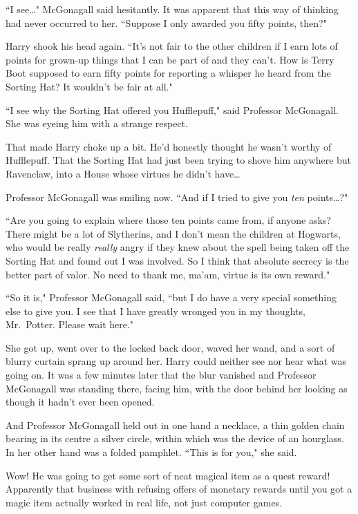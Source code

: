 ``I see{\ldots}" McGonagall said hesitantly. It was apparent that this way of thinking had never occurred to her. ``Suppose I only awarded you fifty points, then?"

Harry shook his head again. ``It's not fair to the other children if I earn lots of points for grown-up things that I can be part of and they can't. How is Terry Boot supposed to earn fifty points for reporting a whisper he heard from the Sorting Hat? It wouldn't be fair at all."

``I see why the Sorting Hat offered you Hufflepuff," said Professor McGonagall. She was eyeing him with a strange respect.

That made Harry choke up a bit. He'd honestly thought he wasn't worthy of Hufflepuff. That the Sorting Hat had just been trying to shove him anywhere but Ravenclaw, into a House whose virtues he didn't have{\ldots}

Professor McGonagall was smiling now. ``And if I tried to give you \emph{ten} points{\ldots}?"

``Are you going to explain where those ten points came from, if anyone asks? There might be a lot of Slytherins, and I don't mean the children at Hogwarts, who would be really \emph{really} angry if they knew about the spell being taken off the Sorting Hat and found out I was involved. So I think that absolute secrecy is the better part of valor. No need to thank me, ma'am, virtue is its own reward."

``So it is," Professor McGonagall said, ``but I do have a very special something else to give you. I see that I have greatly wronged you in my thoughts, Mr.~Potter. Please wait here."

She got up, went over to the locked back door, waved her wand, and a sort of blurry curtain sprang up around her. Harry could neither see nor hear what was going on. It was a few minutes later that the blur vanished and Professor McGonagall was standing there, facing him, with the door behind her looking as though it hadn't ever been opened.

And Professor McGonagall held out in one hand a necklace, a thin golden chain bearing in its centre a silver circle, within which was the device of an hourglass. In her other hand was a folded pamphlet. ``This is for you," she said.

Wow! He was going to get some sort of neat magical item as a quest reward! Apparently that business with refusing offers of monetary rewards until you got a magic item actually worked in real life, not just computer games.


